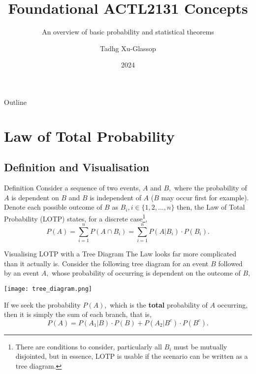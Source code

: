 \documentclass{beamer}
\title{Foundational ACTL2131 Concepts}
\subtitle{An overview of basic probability and statistical theorems}
\author{Tadhg Xu-Glassop}
\institute{UNSW}
\date{2024}
\begin{document}

\begin{frame}
\titlepage
\end{frame}

\begin{frame}{Outline}
    \tableofcontents
\end{frame}

\section{Law of Total Probability}

\subsection{Definition and Visualisation}

\begin{frame}{Definition}
    Consider a sequence of two events, $A$ and $B,$ where the probability of $A$ is dependent on $B$ and $B$ is independent of $A$ ($B$ may occur first for example).
    \newline\newline
    Denote each possible outcome of $B$ as $B_i, i \in \{ 1,2,\dots, n\}$ then, the Law of Total Probability (LOTP) states, for a discrete case\footnote{There are conditions to consider, particularly all $B_i$ must be mutually disjointed, but in essence, LOTP is usable if the scenario can be written as a tree diagram.},
    $$
    P(A) = \sum_{i=1}^{n} P(A\cap B_i) = \sum_{i=1}^n P(A | B_i) \cdot P(B_i).
    $$
\end{frame}

\begin{frame}{Visualising LOTP with a Tree Diagram}
    The Law looks far more complicated than it actually is. Consider the following tree diagram for an event $B$ followed by an event $A,$ whose probability of occurring is dependent on the outcome of $B,$
    \begin{center}
        \texttt{[image: tree\_diagram.png]}
    \end{center}
    If we seek the probability $P(A),$ which is the \textbf{total} probability of $A$ occurring, then it is simply the sum of each branch, that is,
    $$
    P(A) = P(A_1 | B)\cdot P(B) + P(A_2 | B^c) \cdot P(B^c).
    $$
    
\end{frame}
\end{document}
